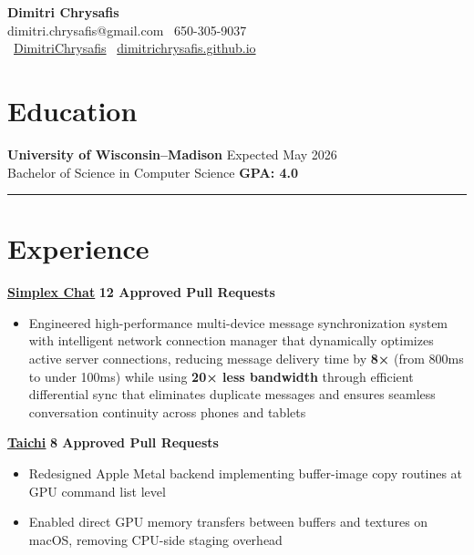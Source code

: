 \documentclass[11pt]{article}
\begin{document}
\begin{center}
\textbf{\Large Dimitri Chrysafis}\\[2pt]
dimitri.chrysafis@gmail.com \textbullet \ 650-305-9037\\
\faGithub \ \href{https://github.com/DimitriChrysafis}{DimitriChrysafis} \textbullet \ \href{https://dimitrichrysafis.github.io/}{dimitrichrysafis.github.io}
\end{center}

\vspace{1pt}

\section*{\textcolor{modernblue}{\Large Education}}
\textbf{University of Wisconsin–Madison} \hfill Expected May 2026\\
Bachelor of Science in Computer Science \hfill \textcolor{accentgreen}{\textbf{GPA: 4.0}}

\noindent\rule{\textwidth}{0.5pt}

\section*{\textcolor{modernblue}{\Large Experience}}
\textbf{\href{https://simplex.chat/}{\underline{Simplex Chat}}} \hfill \textcolor{modernblue}{\textbf{12 Approved Pull Requests}}
\begin{itemize}[leftmargin=*, topsep=0pt, itemsep=0pt, parsep=0pt]
\item Engineered high-performance multi-device message synchronization system with intelligent network connection manager that dynamically optimizes active server connections, reducing message delivery time by \textbf{8×} (from 800ms to under 100ms) while using \textbf{20× less bandwidth} through efficient differential sync that eliminates duplicate messages and ensures seamless conversation continuity across phones and tablets
\end{itemize}
\vspace{1pt}
\noindent\textbf{\href{https://www.taichi-lang.org/}{\underline{Taichi}}} \hfill \textcolor{modernblue}{\textbf{8 Approved Pull Requests}}
\begin{itemize}[leftmargin=*, topsep=0pt, itemsep=0pt, parsep=0pt]
\item Redesigned Apple Metal backend implementing buffer-image copy routines at GPU command list level
\item Enabled direct GPU memory transfers between buffers and textures on macOS, removing CPU-side staging overhead
\end{itemize}
\end{document}
